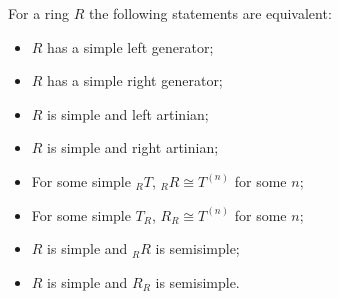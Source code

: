 For a ring $R$ the following statements are equivalent:
\begin{itemize}
\item[(a)] $R$ has a simple left generator;
\item[(a')] $R$ has a simple right generator;
\item[(b)] $R$ is simple and left artinian;
\item[(b')] $R$ is simple and right artinian;
\item[(c)] For some simple ${}_R T$, ${}_R R \cong T^{(n)}$ for some $n$;
\item[(c')] For some simple $T_R$, $R_R \cong T^{(n)}$ for some $n$;
\item[(d)] $R$ is simple and ${}_R R$ is semisimple;
\item[(d')] $R$ is simple and $R_R$ is semisimple.
\end{itemize}
